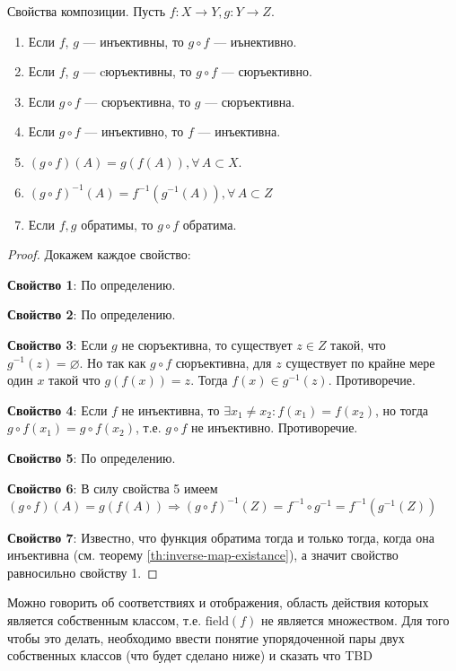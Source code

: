 \documentclass{article}
\newcommand{\rfield}[1]{\mathrm{field}\left(#1\right)}
\begin{document}
\begin{proposition}
    \label{prop:comp-properties}
    Свойства композиции. Пусть \(f: X \rightarrow Y, g: Y \rightarrow Z\).
    \begin{enumerate}
        \item Если \(f\), \(g\) --- инъективны, то \(g \circ f\) --- иънективно.
        \item Если \(f\), \(g\) --- cюръективны, то \(g \circ f\) --- сюръективно.
        \item Если \(g \circ f\) --- сюръективна, то \(g\) --- сюръективна.
        \item Если \(g \circ f\) --- инъективно, то \(f\) --- инъективна.
        \item \((g \circ f) (A) = g(f(A)), \forall\, A \subset X\).
        \item \((g \circ f)^{-1}(A) = f^{-1}(g^{-1}(A)), \forall\, A \subset Z\)
        \item Если \(f, g\) обратимы, то \(g \circ f\) обратима. 
    \end{enumerate}
\end{proposition}
\begin{proof} Докажем каждое свойство: 

    \textbf{Свойство 1}: По определению. 
    
    \textbf{Свойство 2}: По определению. 
    
    \textbf{Свойство 3}: Если \(g\) не сюръективна, то существует \(z \in Z\) такой, что \(g^{-1}(z) = \varnothing\). Но так как \(g \circ f\) сюръективна, для \(z\) существует по крайне мере один \(x\) такой что \(g(f(x)) = z\). Тогда \(f(x) \in g^{-1}(z)\). Противоречие.
    
    \textbf{Свойство 4}: Если \(f\) не инъективна, то \(\exists x_1 \ne x_2: f(x_1) = f(x_2)\), но тогда \(g \circ f (x_1) = g \circ f (x_2)\), т.е. \(g \circ f\) не инъективно. Противоречие. 
    
    \textbf{Свойство 5}: По определению. 
    
    \textbf{Свойство 6}: В силу свойства 5 имеем \((g \circ f)(A) = g(f(A)) \Rightarrow (g \circ f)^{-1}(Z) = f^{-1} \circ g^{-1} = f^{-1}\left(g^{-1}(Z)\right)\)
    
    \textbf{Свойство 7}: Известно, что функция обратима тогда и только тогда, когда она инъективна (см. теорему \ref{th:inverse-map-existance}), а значит свойство равносильно свойству 1.
\end{proof}


\begin{remark*}
    Можно говорить об соответствиях и отображения, область действия которых является собственным классом, т.е. $\rfield{f}$ не является множеством. Для того чтобы это делать, необходимо ввести понятие упорядоченной пары двух собственных классов (что будет сделано ниже) и сказать что TBD 
\end{remark*}
\end{document}
